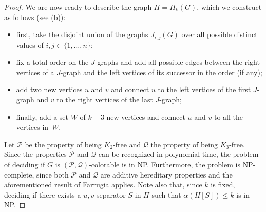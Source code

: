 \documentclass[11pt]{article}
\theoremstyle{definition}
\newcommand{\NP}{\textup{\textsf{NP}}}
\begin{document}
\begin{proof}
We are now ready to describe the graph $H = H_k(G)$, which we construct as follows (see  (b)):
\begin{itemize}
    \item first, take the disjoint union of the graphs $J_{i,j}(G)$ over all possible distinct values of $i,j \in \{1, \dots, n\}$;
    \item fix a total order on the $J$-graphs and add all possible edges between the right vertices of a $J$-graph and the left vertices of its successor in the order (if any);
    \item add two new vertices $u$ and $v$ and connect $u$ to the left vertices of the first $J$-graph and $v$ to the right vertices of the last $J$-graph;
    \item finally, add a set $W$ of $k-3$ new vertices and connect $u$ and $v$ to all the vertices in~$W$.
\end{itemize}

Let $\mathcal{P}$ be the property of being $K_2$-free and $\mathcal{Q}$ the property of being $K_3$-free.
Since the properties $\mathcal{P}$ and $\mathcal{Q}$ can be recognized in polynomial time, the problem of deciding if $G$ is $(\mathcal{P},\mathcal{Q})$-colorable is in \NP.
Furthermore, the problem is \NP-complete, since both $\mathcal{P}$ and $\mathcal{Q}$ are additive hereditary properties and the aforementioned result of Farrugia \cite{MR2097312} applies.
Note also that, since $k$ is fixed, deciding if there exists a $u{,}v$-separator $S$ in $H$ such that $\alpha(H[S]) \leq k$ is in \NP.


\end{proof}
\end{document}
